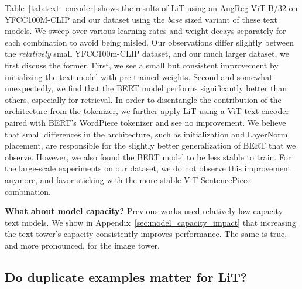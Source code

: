 \documentclass[10pt,twocolumn,letterpaper]{article}
\def \lit {LiT\xspace}
\begin{document}
Table~\ref{tab:text_encoder} shows the results of \lit{} using an AugReg-ViT-B/32 on YFCC100M-CLIP and our dataset using the \emph{base} sized variant of these text models.
We sweep over various learning-rates and weight-decays separately for each combination to avoid being misled.
Our observations differ slightly between the \emph{relatively} small YFCC100m-CLIP dataset, and our much larger dataset, we first discuss the former.
First, we see a small but consistent improvement by initializing the text model with pre-trained weights.
Second and somewhat unexpectedly, we find that the BERT model performs significantly better than others, especially for retrieval.
In order to disentangle the contribution of the architecture from the tokenizer, we further apply \lit using a ViT text encoder paired with BERT's WordPiece tokenizer and see no improvement.
We believe that small differences in the architecture, such as initialization and LayerNorm placement, are responsible for the slightly better generalization of BERT that we observe. However, we also found the BERT model to be less stable to train.
For the large-scale experiments on our dataset, we do not observe this improvement anymore, and favor sticking with the more stable ViT SentencePiece combination.

\textbf{What about model capacity?} Previous works used relatively low-capacity text models. We show in Appendix~\ref{sec:model_capacity_impact} that increasing the text tower's capacity consistently improves performance. The same is true, and more pronounced, for the image tower.


\subsection{Do duplicate examples matter for \protect\lit?}
\label{sec:deduplication}
\end{document}
